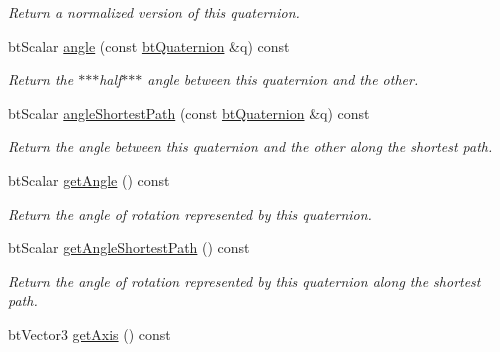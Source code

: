 \begin{DoxyCompactItemize}
\begin{DoxyCompactList}\small\item\em Return a normalized version of this quaternion. \end{DoxyCompactList}\item 
bt\+Scalar \hyperlink{classbt_quaternion_a6398a143dbe4bbf6211d90bc8c2dd2bc}{angle} (const \hyperlink{classbt_quaternion}{bt\+Quaternion} \&q) const 
\begin{DoxyCompactList}\small\item\em Return the $\ast$$\ast$$\ast$half$\ast$$\ast$$\ast$ angle between this quaternion and the other. \end{DoxyCompactList}\item 
bt\+Scalar \hyperlink{classbt_quaternion_a3160453535401db05d3926d7bc0ca5de}{angle\+Shortest\+Path} (const \hyperlink{classbt_quaternion}{bt\+Quaternion} \&q) const 
\begin{DoxyCompactList}\small\item\em Return the angle between this quaternion and the other along the shortest path. \end{DoxyCompactList}\item 
\hypertarget{classbt_quaternion_a4071aa455c5850f651be8d49d3db7133}{bt\+Scalar \hyperlink{classbt_quaternion_a4071aa455c5850f651be8d49d3db7133}{get\+Angle} () const }\label{classbt_quaternion_a4071aa455c5850f651be8d49d3db7133}

\begin{DoxyCompactList}\small\item\em Return the angle of rotation represented by this quaternion. \end{DoxyCompactList}\item 
\hypertarget{classbt_quaternion_ad6a6022b5b0d3ec7d900e01c367ced05}{bt\+Scalar \hyperlink{classbt_quaternion_ad6a6022b5b0d3ec7d900e01c367ced05}{get\+Angle\+Shortest\+Path} () const }\label{classbt_quaternion_ad6a6022b5b0d3ec7d900e01c367ced05}

\begin{DoxyCompactList}\small\item\em Return the angle of rotation represented by this quaternion along the shortest path. \end{DoxyCompactList}\item 
\hypertarget{classbt_quaternion_a465718d2a4eb88eb0bd1ab98e73140c3}{bt\+Vector3 \hyperlink{classbt_quaternion_a465718d2a4eb88eb0bd1ab98e73140c3}{get\+Axis} () const }\label{classbt_quaternion_a465718d2a4eb88eb0bd1ab98e73140c3}


\end{DoxyCompactItemize}
